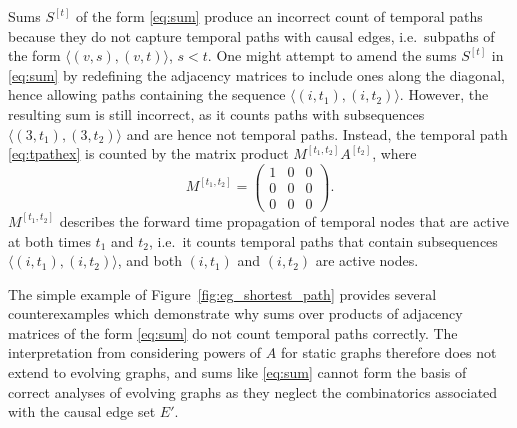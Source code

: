 \documentclass[10pt,conference,compsocconf]{IEEEtran}
\theoremstyle{definition}
\begin{document}
Sums $S^{[t]}$ of the form \eqref{eq:sum} produce an incorrect count of temporal
paths because they do not capture temporal paths with causal edges, i.e.\ subpaths
of the form $\langle (v, s), (v, t) \rangle$, $s < t$.
One might attempt to amend the sums $S^{[t]}$ in \eqref{eq:sum} by redefining
the adjacency matrices to include ones along the diagonal, hence allowing
paths containing the sequence $\langle (i, t_1), (i, t_2) \rangle$. However, the resulting
sum is still incorrect, as it counts paths with subsequences $\langle (3, t_1), (3, t_2) \rangle$
and are hence not temporal paths. Instead, the temporal path \eqref{eq:tpathex}
is counted by the matrix product $M^{[t_1, t_2]} A^{[t_2]}$, where
\begin{equation}
    M^{[t_1, t_2]} = \begin{pmatrix}1 & 0 & 0 \\ 0 & 0 & 0 \\ 0 & 0 & 0\end{pmatrix}.
\label{eq:m-example}
\end{equation}
$M^{[t_1, t_2]}$ describes the forward time propagation of temporal nodes that
are active at both times $t_1$ and $t_2$, i.e.\ it counts
temporal paths that contain subsequences $\langle (i, t_1), (i, t_2) \rangle$,
and both $(i, t_1)$ and $(i, t_2)$ are active nodes.

The simple example of Figure~\ref{fig:eg_shortest_path} provides several
counterexamples which demonstrate why sums over products of adjacency matrices of
the form \eqref{eq:sum} do not count temporal paths correctly. The interpretation
from considering powers of $A$ for static graphs therefore does not extend to
evolving graphs, and sums like \eqref{eq:sum} cannot form the basis of correct
analyses of evolving graphs as they neglect the combinatorics associated with
the causal edge set $E'$.

\end{document}
